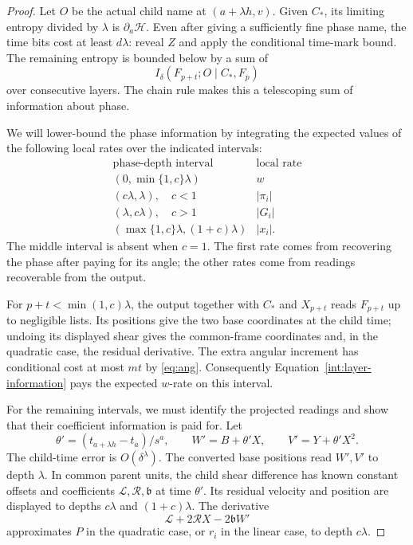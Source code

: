 \begin{proof}
Let $O$ be the actual child name at $(a+\lambda h,v)$. Given $C_*$,
its limiting entropy divided by $\lambda$ is $\partial_a\mathcal H$.
Even after giving a sufficiently fine phase name, the time bits cost
at least $d\lambda$: reveal $Z$ and apply the conditional time-mark
bound. The remaining entropy is bounded below by a sum of
\begin{equation}\label{int:layer-information}
 I_\delta(F_{p+t};O\mid C_*,F_p)
\end{equation}
over consecutive layers. The chain rule makes this a telescoping
sum of information about phase.

We will lower-bound the phase information by integrating the expected
values of the following local rates over the indicated intervals:
\[
\begin{array}{c|c}
 \text{phase-depth interval}&\text{local rate}\\ \hline
 (0,\min\{1,c\}\lambda)&w\\
 (c\lambda,\lambda),\quad c<1&|\pi_i|\\
 (\lambda,c\lambda),\quad c>1&|G_i|\\
 (\max\{1,c\}\lambda,(1+c)\lambda)&|x_i|.
\end{array}
\]
The middle interval is absent when $c=1$. The first rate comes
from recovering the phase after paying for its angle; the other
rates come from readings recoverable from the output.

For $p+t<\min(1,c)\lambda$, the output together with $C_*$ and
$X_{p+t}$ reads $F_{p+t}$ up to negligible lists. Its positions
give the two base coordinates at the child time; undoing its
displayed shear gives the common-frame coordinates and, in the
quadratic case, the residual derivative. The extra angular
increment has conditional cost at most $mt$ by
\eqref{eq:ang}. Consequently Equation~\eqref{int:layer-information}
pays the expected $w$-rate on this interval.

For the remaining intervals, we must identify the projected
readings and show that their coefficient information is paid for.
Let
\[
 \theta'=(t_{a+\lambda h}-t_a)/s^a,\qquad
 W'=B+\theta'X,\qquad V'=Y+\theta'X^2.
\]
The child-time error is $O(\delta^\lambda)$. The converted base
positions read $W',V'$ to depth $\lambda$. In common parent units,
the child shear difference has known constant offsets and
coefficients $\mathcal L,\mathcal R,\mathfrak b$ at time
$\theta'$. Its residual velocity and position are displayed to
depths $c\lambda$ and $(1+c)\lambda$. The derivative
\[
 \mathcal L+2\mathcal RX-2\mathfrak bW'
\]
approximates $P$ in the quadratic case, or $r_i$ in the linear
case, to depth $c\lambda$.


\end{proof}

